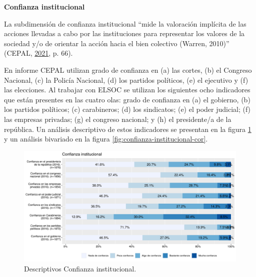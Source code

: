 \documentclass[
  12pt,
]{book}
\begin{document}
\textbf{Confianza institucional}

La subdimensión de confianza institucional ``mide la valoración implícita de las acciones llevadas a cabo por las instituciones para representar los valores de la sociedad y/o de orientar la acción hacia el bien colectivo (Warren, 2010)'' (CEPAL, \protect\hyperlink{ref-cepal_Cohesion_2021}{2021}, p. 66).

En informe CEPAL utilizan grado de confianza en (a) las cortes, (b) el Congreso Nacional, (c) la Policía Nacional, (d) los partidos políticos, (e) el ejecutivo y (f) las elecciones. Al trabajar con ELSOC se utilizan los siguientes ocho indicadores que están presentes en las cuatro olas: grado de confianza en (a) el gobierno, (b) los partidos políticos; (c) carabineros; (d) los sindicatos; (e) el poder judicial; (f) las empresas privadas; (g) el congreso nacional; y (h) el presidente/a de la república. Un análisis descriptivo de estos indicadores se presentan en la figura \ref{fig:confianza-institucional} y un análisis bivariado en la figura \ref{fig:confianza-institucional-cor}.

\begin{figure}[H]

{\centering \includegraphics[width=1\linewidth,height=1\textheight]{output/graphs/confianza-institucional} 

}

\caption{Descriptivos Confianza institucional.}\label{fig:confianza-institucional}
\end{figure}
\end{document}

